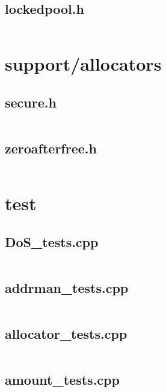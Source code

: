 \documentclass{article}
\begin{document}
\subsection{lockedpool.h}
\inputminted{cpp}{/home/dufferzafar/dev/@clones/bitcoin/src/support/lockedpool.h}
\newpage

\section{support/allocators}

\subsection{secure.h}
\inputminted{cpp}{/home/dufferzafar/dev/@clones/bitcoin/src/support/allocators/secure.h}
\newpage

\subsection{zeroafterfree.h}
\inputminted{cpp}{/home/dufferzafar/dev/@clones/bitcoin/src/support/allocators/zeroafterfree.h}
\newpage

\section{test}

\subsection{DoS\_tests.cpp}
\inputminted{cpp}{/home/dufferzafar/dev/@clones/bitcoin/src/test/DoS_tests.cpp}
\newpage

\subsection{addrman\_tests.cpp}
\inputminted{cpp}{/home/dufferzafar/dev/@clones/bitcoin/src/test/addrman_tests.cpp}
\newpage

\subsection{allocator\_tests.cpp}
\inputminted{cpp}{/home/dufferzafar/dev/@clones/bitcoin/src/test/allocator_tests.cpp}
\newpage

\subsection{amount\_tests.cpp}
\inputminted{cpp}{/home/dufferzafar/dev/@clones/bitcoin/src/test/amount_tests.cpp}
\newpage
\end{document}
